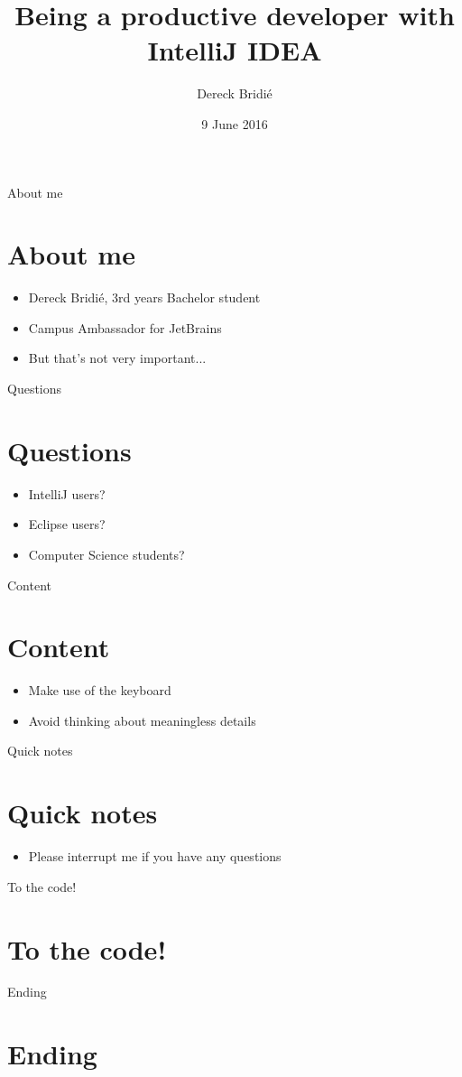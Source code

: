 \documentclass{beamer}
\title{Being a productive developer with IntelliJ IDEA}
\author{Dereck Bridi\'e}
\date{9 June 2016}
\begin{document}
\begin{frame}
\maketitle
\end{frame}

\begin{frame}{About me}
\section{About me}
\begin{itemize}
    \item Dereck Bridi\'e, 3rd years Bachelor student
    \item Campus Ambassador for JetBrains
    \pause
    \item But that's not very important...
\end{itemize}
\end{frame}

\begin{frame}{Questions}
\section{Questions}
\begin{itemize}
    \item IntelliJ users?
    \item Eclipse users?
    \pause
    \item Computer Science students?
\end{itemize}
\end{frame}

\begin{frame}{Content}
\section{Content}
\begin{itemize}
    \item Make use of the keyboard
    \item Avoid thinking about meaningless details
\end{itemize}
\end{frame}

\begin{frame}{Quick notes}
\section{Quick notes}
\begin{itemize}
    \item Please interrupt me if you have any questions
\end{itemize}
\end{frame}

\begin{frame}{To the code!}
\section{To the code!}
\end{frame}

\begin{frame}{Ending}
\section{Ending}
\end{frame}
\end{document}
